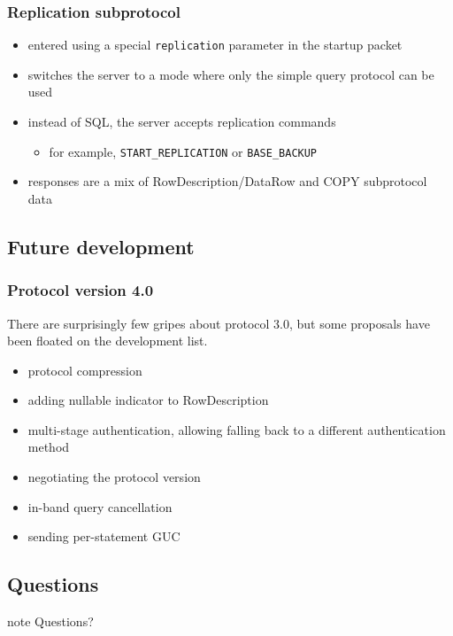 \documentclass{beamer}
\begin{document}
\begin{frame}
  \frametitle{Replication subprotocol}

  \begin{itemize}
  \item entered using a special \texttt{replication} parameter in the startup
    packet
  \item switches the server to a mode where only the simple query protocol can
    be used
  \item instead of SQL, the server accepts replication commands
    \begin{itemize}
    \item for example, \texttt{START\_REPLICATION} or \texttt{BASE\_BACKUP}
    \end{itemize}
  \item responses are a mix of RowDescription/DataRow and COPY subprotocol data
  \end{itemize}
\end{frame}

\subsection{Future development}
\begin{frame}
  \frametitle{Protocol version 4.0}

  There are \alert{surprisingly few} gripes about protocol 3.0, but some
  proposals have been floated on the development list.

  \begin{itemize}
  \item protocol compression
  \item adding nullable indicator to RowDescription
  \item multi-stage authentication, allowing falling back to a different
    authentication method
  \item negotiating the protocol version
  \item in-band query cancellation
  \item sending per-statement GUC
  \end{itemize}
\end{frame}

\subsection*{Questions}

\begin{frame}
\begin{beamercolorbox}[center]{note}
  \Huge Questions?
\end{beamercolorbox}
\end{frame}
\end{document}
